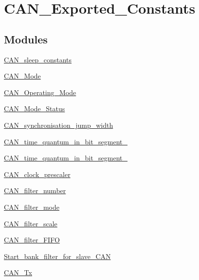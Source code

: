 \hypertarget{group___c_a_n___exported___constants}{}\section{C\+A\+N\+\_\+\+Exported\+\_\+\+Constants}
\label{group___c_a_n___exported___constants}
\subsection*{Modules}
\begin{DoxyCompactItemize}
\item 
\mbox{\hyperlink{group___c_a_n__sleep__constants}{C\+A\+N\+\_\+sleep\+\_\+constants}}
\item 
\mbox{\hyperlink{group___c_a_n___mode}{C\+A\+N\+\_\+\+Mode}}
\item 
\mbox{\hyperlink{group___c_a_n___operating___mode}{C\+A\+N\+\_\+\+Operating\+\_\+\+Mode}}
\item 
\mbox{\hyperlink{group___c_a_n___mode___status}{C\+A\+N\+\_\+\+Mode\+\_\+\+Status}}
\item 
\mbox{\hyperlink{group___c_a_n__synchronisation__jump__width}{C\+A\+N\+\_\+synchronisation\+\_\+jump\+\_\+width}}
\item 
\mbox{\hyperlink{group___c_a_n__time__quantum__in__bit__segment__1}{C\+A\+N\+\_\+time\+\_\+quantum\+\_\+in\+\_\+bit\+\_\+segment\+\_}}
\item 
\mbox{\hyperlink{group___c_a_n__time__quantum__in__bit__segment__2}{C\+A\+N\+\_\+time\+\_\+quantum\+\_\+in\+\_\+bit\+\_\+segment\+\_}}
\item 
\mbox{\hyperlink{group___c_a_n__clock__prescaler}{C\+A\+N\+\_\+clock\+\_\+prescaler}}
\item 
\mbox{\hyperlink{group___c_a_n__filter__number}{C\+A\+N\+\_\+filter\+\_\+number}}
\item 
\mbox{\hyperlink{group___c_a_n__filter__mode}{C\+A\+N\+\_\+filter\+\_\+mode}}
\item 
\mbox{\hyperlink{group___c_a_n__filter__scale}{C\+A\+N\+\_\+filter\+\_\+scale}}
\item 
\mbox{\hyperlink{group___c_a_n__filter___f_i_f_o}{C\+A\+N\+\_\+filter\+\_\+\+F\+I\+FO}}
\item 
\mbox{\hyperlink{group___start__bank__filter__for__slave___c_a_n}{Start\+\_\+bank\+\_\+filter\+\_\+for\+\_\+slave\+\_\+\+C\+AN}}
\item 
\mbox{\hyperlink{group___c_a_n___tx}{C\+A\+N\+\_\+\+Tx}}
\item 

\end{DoxyCompactItemize}
